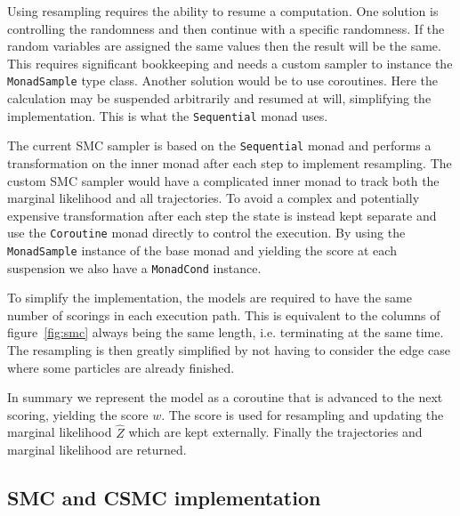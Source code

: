 Using resampling requires the ability to resume a computation.
One solution is  controlling the randomness and then continue with a specific randomness.
If the random variables are assigned the same values then the result will be the same.
This requires significant bookkeeping and needs a custom sampler to instance the \texttt{MonadSample} type class.
Another solution would be to use coroutines.
Here the calculation may be suspended arbitrarily and resumed at will, simplifying the implementation.
This is what the \texttt{Sequential} monad uses.

The current SMC sampler is based on the \texttt{Sequential} monad and performs a transformation on the inner monad after each step to implement resampling.
The custom SMC sampler would have a complicated inner monad to track both the marginal likelihood and all trajectories.
To avoid a complex and potentially expensive transformation after each step the state is instead kept separate and use the \texttt{Coroutine} monad directly to control the execution.
By using the \texttt{MonadSample} instance of the base monad and yielding the score at each suspension we also have a \texttt{MonadCond} instance.

To simplify the implementation, the models are required to have the same number of scorings in each execution path. This is equivalent to the columns of figure~\ref{fig:smc} always being the same length, i.e. terminating at the same time. The resampling is then greatly simplified by not having to consider the edge case where some particles are already finished.

In summary we represent the model as a coroutine that is advanced to the next scoring, yielding the score $w$. The score is used for resampling and updating the marginal likelihood $\hat Z$ which are kept externally. Finally the trajectories and marginal likelihood are returned.

\subsection{SMC and CSMC implementation}

